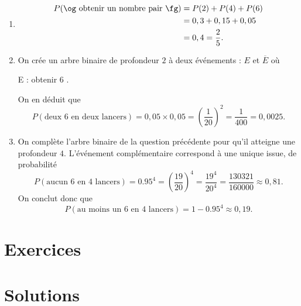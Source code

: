 {	\begin{enumerate}
		\item 
			\begin{align*}
				P(\text{\og obtenir un nombre pair \fg}) &= P(2) + P(4) + P(6) \\
				&= 0,3 + 0,15 + 0,05 \\
				&= 0,4 = \frac25.
			\end{align*}
		\item
			On crée un arbre binaire de profondeur $2$ à deux événements : $E$ et $\overline{E}$ où
				\begin{center}
					E : \og obtenir $6$ \fg.
				\end{center}
			On en déduit que
			\[ P(\text{deux $6$ en deux lancers}) = 0,05 \times 0,05 = \left(\dfrac1{20}\right)^2 = \dfrac1{400} = 0,0025. \]
		\item
			On complète l'arbre binaire de la question précédente pour qu'il atteigne une profondeur $4$.
			L'événement complémentaire correspond à une unique issue, de probabilité
				\[ P(\text{aucun $6$ en $4$ lancers}) = 0.95^4 = \left(\dfrac{19}{20}\right)^4 = \dfrac{19^4}{20^4} = \dfrac{130321}{160000} \approx 0,81. \]
			On conclut donc que
				\[ P(\text{au moins un $6$ en $4$ lancers}) = 1-0.95^4 \approx 0,19. \]
				
	\end{enumerate}
}


\section*{Exercices}

\shipoutExercise

\section*{Solutions}

\shipoutAnswer




